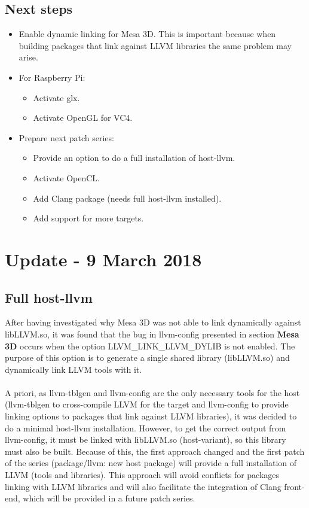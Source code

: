 \documentclass[12pt,a4paper,oneside]{article}
\begin{document}
\subsection*{Next steps}
\begin{itemize}
  \item Enable dynamic linking for Mesa 3D. This is important because when building
        packages that link against LLVM libraries the same problem may arise.
  \item For Raspberry Pi:
    \begin{itemize}
      \item Activate glx.
      \item Activate OpenGL for VC4.
    \end{itemize}
  \item Prepare next patch series:
  \begin{itemize}
    \item Provide an option to do a full installation of host-llvm.
    \item Activate OpenCL.
    \item Add Clang package (needs full host-llvm installed).
    \item Add support for more targets.
  \end{itemize}
\end{itemize}

\newpage
\section*{Update - 9 March 2018}

\subsection*{Full host-llvm}
After having investigated why Mesa 3D was not able to link dynamically against
libLLVM.so, it was found that the bug in llvm-config presented in section \textbf{Mesa 3D}
occurs when the option LLVM\_LINK\_LLVM\_DYLIB is not enabled. The purpose of this
option is to generate a single shared library (libLLVM.so) and dynamically link
LLVM tools with it.\\\\
A priori, as llvm-tblgen and llvm-config are the only necessary tools for the host
(llvm-tblgen to cross-compile LLVM for the target and llvm-config to provide linking
options to packages that link against LLVM libraries), it was decided to do a
minimal host-llvm installation. However, to get the correct output from llvm-config,
it must be linked with libLLVM.so (host-variant), so this library must also be built.
Because of this, the first approach changed and the first patch of the series
(package/llvm: new host package) will provide a full installation of LLVM (tools
and libraries). This approach will avoid conflicts for packages linking with
LLVM libraries and will also facilitate the integration of Clang front-end, which
will be provided in a future patch series.
\end{document}
